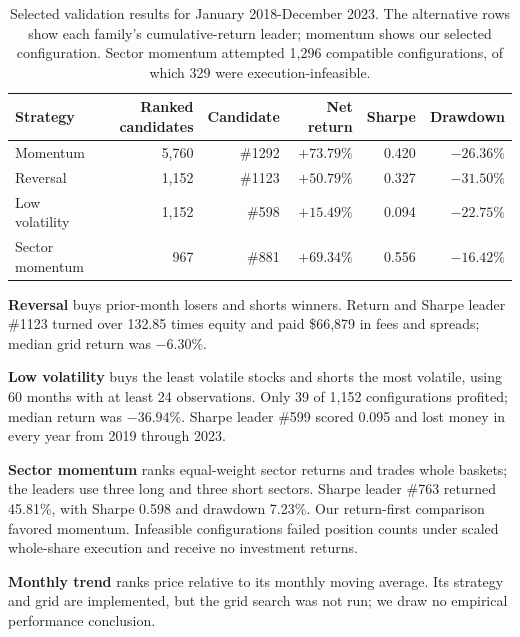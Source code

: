 \begin{table}[htbp]
  \centering
  \begin{threeparttable}
  \small
  \setlength{\tabcolsep}{5pt}
  \begin{tabular}{lrrrrr}
    \toprule
    Strategy & Ranked candidates & Candidate & Net return & Sharpe & Drawdown \\
    \midrule
    Momentum & 5,760 & \#1292 & $+73.79\%$ & 0.420 & $-26.36\%$ \\
    Reversal & 1,152 & \#1123 & $+50.79\%$ & 0.327 & $-31.50\%$ \\
    Low volatility & 1,152 & \#598 & $+15.49\%$ & 0.094 & $-22.75\%$ \\
    Sector momentum & 967 & \#881 & $+69.34\%$ & 0.556 & $-16.42\%$ \\
    \bottomrule
  \end{tabular}
  \caption[Selected validation results by strategy family]{Selected validation results for January 2018-December 2023.
  The alternative rows show each family's cumulative-return leader; momentum
  shows our selected configuration. Sector momentum attempted 1,296 compatible
  configurations, of which 329 were execution-infeasible.}
  \label{tab:alternative-validation}
  \end{threeparttable}
\end{table}

\FloatBarrier
\textbf{Reversal} buys prior-month losers and shorts winners. Return and
Sharpe leader \#1123 turned over 132.85 times equity and paid \$66,879 in
fees and spreads; median grid return was $-6.30\%$.

\textbf{Low volatility} buys the least volatile stocks and shorts the most
volatile, using 60 months with at least 24 observations. Only 39 of 1,152
configurations profited; median return was $-36.94\%$. Sharpe leader \#599
scored 0.095 and lost money in every year from 2019 through 2023.

\textbf{Sector momentum} ranks equal-weight sector returns and trades whole
baskets; the leaders use three long and three short sectors. Sharpe leader
\#763 returned 45.81\%, with Sharpe 0.598 and drawdown 7.23\%. Our return-first
comparison favored momentum. Infeasible configurations failed position counts
under scaled whole-share execution and receive no investment returns.

\begin{samepage}
\textbf{Monthly trend} ranks price relative to its monthly moving average.
Its strategy and grid are implemented, but the grid search was not run;
we draw no empirical performance conclusion.

\end{samepage}

